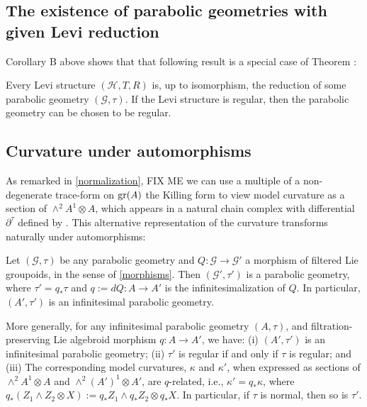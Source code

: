 \documentclass[leqno,12pt]{amsart} %
\begin{document}
\subsection{The existence of parabolic geometries with given Levi reduction}\label{existence_}

Corollary B above shows that that following result is a special case of Theorem
:

\begin{theorem}[Existence]
  Every Levi structure $({\mathcal H}, T, R)$ is, up to isomorphism, the reduction of some
  parabolic geometry $({\mathcal G}, \tau)$. If the Levi structure is regular, then the
  parabolic geometry can be chosen to be regular.
\end{theorem}

\subsection{Curvature under automorphisms}\label{transform_}
As remarked in \ref{normalization}, FIX ME we can use a multiple of a non-degenerate trace-form on $\operatorname{\operatorname{gr}}(A)$ the Killing form to view model
curvature as a section of $\wedge^2 A^1 \otimes A$, which appears in a natural chain
complex with differential $\partial^\tau$ defined by
. This alternative representation of the curvature
transforms naturally under automorphisms:

\begin{theorem} Let $({\mathcal G}, \tau)$ be any
  parabolic geometry and $Q \colon {\mathcal G} \rightarrow {\mathcal G}'$ a morphism of
  filtered Lie groupoids, in the sense of \ref{morphisms}. Then $({\mathcal G}', \tau')$
  is a parabolic geometry, where $\tau'=q_*\tau $ and $q := dQ \colon A \rightarrow A'$ is
  the infinitesimalization of $Q$. In particular, $(A',\tau')$ is an infinitesimal
  parabolic geometry.

  More generally, for any infinitesimal parabolic geometry $(A, \tau)$, and
  filtration-preserving Lie algebroid morphism $q \colon A \rightarrow A'$, we have: (i)
  $(A', \tau')$ is an infinitesimal parabolic geometry; (ii) $\tau' $ is regular if and
  only if $\tau $ is regular; and (iii) The corresponding model curvatures, $\kappa$ and
  $\kappa'$, when expressed as sections of $\wedge^2 A^1 \otimes A$ and
  $\wedge^2 (A')^1 \otimes A'$, are $q$-related, i.e., $\kappa' = q_* \kappa $, where
  $q_*(Z_1\wedge Z_2 \otimes X) := q_*Z_1\wedge q_*Z_2 \otimes q_*X$. In particular, if
  $\tau $ is normal, then so is $\tau'$.
\end{theorem}
\end{document}
